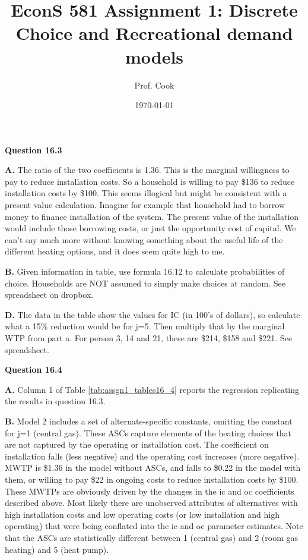 \documentclass[12pt]{article}
\title{EconS 581 Assignment 1: Discrete Choice and Recreational demand models}
\author[1]{Prof. Cook}
\date{\mydate\today}
\begin{document}
  \maketitle
\singlespace

\textbf{Question 16.3}

\textbf{A.} The ratio of the two coefficients is 1.36.  This is the marginal willingness to pay to reduce installation costs.  So a household is willing to pay \$136 to reduce installation costs by \$100.  This seems illogical but might be consistent with a present value calculation.  Imagine for example that household had to borrow money to finance installation of the system.  The present value of the installation would include those borrowing costs, or just the opportunity cost of capital. We can't say much more without knowing something about the useful life of the different heating options, and it does seem quite high to me.

\bigskip

\textbf{B.}  Given information in table, use formula 16.12 to calculate probabilities of choice.  Households are NOT assumed to simply make choices at random.  See spreadsheet on dropbox.
\bigskip

\textbf{D.}  The data in the table show the values for IC (in 100's of dollars), so calculate what a 15\% reduction would be for j=5.  Then multiply that by the marginal WTP from part a.  For person 3, 14 and 21, these are \$214, \$158 and \$221. See spreadsheet.
\bigskip



\textbf{Question 16.4}


\bigskip
\textbf{A.}   Column 1 of Table  \ref{tab:assgn1_tables16_4} reports the regression replicating the results in question 16.3.
\bigskip


\textbf{B.} Model 2 includes a set of alternate-specific constants, omitting the constant for j=1 (central gas).  These ASCs capture elements of the heating choices that are not captured by the operating or installation cost.  The coefficient on installation falls (less negative) and the operating cost increases (more negative).  MWTP is \$1.36 in the model without ASCs, and falls to \$0.22 in the model with them, or willing to pay \$22 in ongoing costs to reduce installation costs by \$100. These MWTPs are obviously driven by the changes in the ic and oc coefficients described above.  Most likely there are unobserved attributes of alternatives with high installation costs and low operating costs (or low installation and high operating) that were being conflated into the ic and oc parameter estimates.  Note that the ASCs are statistically different between 1 (central gas) and 2 (room gas heating) and 5 (heat pump).    
\end{document}
